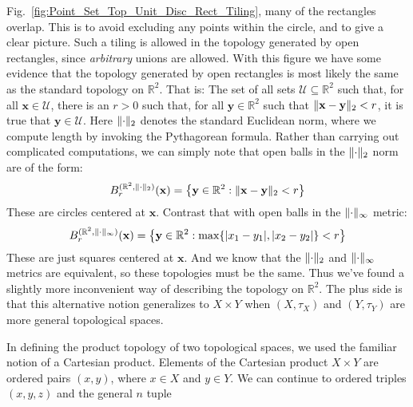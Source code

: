     Fig.~\ref{fig:Point_Set_Top_Unit_Disc_Rect_Tiling}, many of
    the rectangles overlap. This is to avoid excluding any points
    within the circle, and to give a clear picture. Such a tiling
    is allowed in the topology generated by open rectangles, since
    \textit{arbitrary} unions are allowed. With this figure we have
    some evidence that the topology generated by open rectangles is
    most likely the same as the standard topology on $\mathbb{R}^{2}$.
    That is: The set of all sets $\mathcal{U}\subseteq\mathbb{R}^{2}$
    such that, for all $\mathbf{x}\in\mathcal{U}$, there is an $r>0$
    such that, for all $\mathbf{y}\in\mathbb{R}^{2}$ such that
    $\lVert\mathbf{x}-\mathbf{y}\rVert_{2}<r$, it is true that
    $\mathbf{y}\in\mathcal{U}$. Here $\lVert\cdot\rVert_{2}$ denotes the
    standard Euclidean norm, where we compute length by
    invoking the Pythagorean formula. Rather than carrying out
    complicated computations, we can simply note that open
    balls in the $\lVert\cdot\rVert_{2}$ norm are of the form:
    \begin{equation}
        B_{r}^{(\mathbb{R}^{2},\lVert\cdot\rVert_{2})}(\mathbf{x})
            =\big\{\mathbf{y}\in\mathbb{R}^{2}:
                \lVert\mathbf{x}-\mathbf{y}\rVert_{2}<r\big\}
    \end{equation}
    These are circles centered at $\mathbf{x}$.
    Contrast that with open balls in the $\lVert\cdot\rVert_{\infty}$
    metric:
    \begin{equation}
        B_{r}^{(\mathbb{R}^{2},\lVert\cdot\rVert_{\infty})}(\mathbf{x})
            =\big\{\mathbf{y}\in\mathbb{R}^{2}:
                \max\{|x_{1}-y_{1}|,|x_{2}-y_{2}|\}<r\big\}
    \end{equation}
    These are just squares centered at $\mathbf{x}$. And we know
    that the $\lVert\cdot\rVert_{2}$ and $\lVert\cdot\rVert_{\infty}$ metrics
    are equivalent, so these topologies must be the same. Thus
    we've found a slightly more inconvenient way of describing
    the topology on $\mathbb{R}^{2}$. The plus side is that
    this alternative notion generalizes to $X\times{Y}$
    when $(X,\tau_{X})$ and $(Y,\tau_{Y})$ are more general
    topological spaces.
    \par\hfill\par
    In defining the product topology of two topological spaces,
    we used the familiar notion of a Cartesian product. Elements
    of the Cartesian product $X\times{Y}$ are ordered pairs
    $(x,y)$, where $x\in{X}$ and $y\in{Y}$. We can continue to
    ordered triples $(x,y,z)$ and the general $n$ tuple
